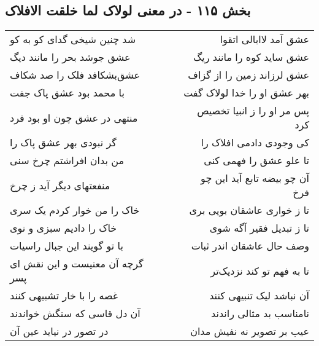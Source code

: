 \begin{center}
\section*{بخش ۱۱۵ - در معنی لولاک لما خلقت الافلاک}
\label{sec:sh115}
\begin{longtable}{l p{0.5cm} r}
شد چنین شیخی گدای کو به کو
&&
عشق آمد لاابالی اتقوا
\\
عشق جوشد بحر را مانند دیگ
&&
عشق ساید کوه را مانند ریگ
\\
عشق‌بشکافد فلک را صد شکاف
&&
عشق لرزاند زمین را از گزاف
\\
با محمد بود عشق پاک جفت
&&
بهر عشق او را خدا لولاک گفت
\\
منتهی در عشق چون او بود فرد
&&
پس مر او را ز انبیا تخصیص کرد
\\
گر نبودی بهر عشق پاک را
&&
کی وجودی دادمی افلاک را
\\
من بدان افراشتم چرخ سنی
&&
تا علو عشق را فهمی کنی
\\
منفعتهای دیگر آید ز چرخ
&&
آن چو بیضه تابع آید این چو فرخ
\\
خاک را من خوار کردم یک سری
&&
تا ز خواری عاشقان بویی بری
\\
خاک را دادیم سبزی و نوی
&&
تا ز تبدیل فقیر آگه شوی
\\
با تو گویند این جبال راسیات
&&
وصف حال عاشقان اندر ثبات
\\
گرچه آن معنیست و این نقش ای پسر
&&
تا به فهم تو کند نزدیک‌تر
\\
غصه را با خار تشبیهی کنند
&&
آن نباشد لیک تنبیهی کنند
\\
آن دل قاسی که سنگش خواندند
&&
نامناسب بد مثالی راندند
\\
در تصور در نیاید عین آن
&&
عیب بر تصویر نه نفیش مدان
\\
\end{longtable}
\end{center}
